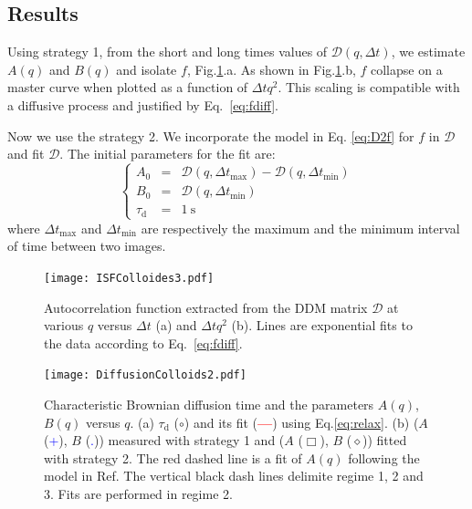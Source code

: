 \documentclass[prb,twocolumn,amsmath,amssymb]{revtex4-1}
\newcommand{\tgn}[1]{{\color{blue}#1}} %
\begin{document}
\subsection{Results}
\label{sec:resultcolloid}
Using strategy 1, from the short and long times values of $\mathcal{D}(q,\Delta t)$, we estimate $A(q)$ and $B(q)$ and isolate $f$, Fig.\ref{fig:ISF}.a. As shown in  Fig.\ref{fig:ISF}.b, $f$ collapse on a master curve when plotted as a function of $\Delta t q^2$. This scaling is compatible with a diffusive process and justified by Eq.~\ref{eq:fdiff}. 

Now we use the strategy 2. We incorporate the model in Eq. \eqref{eq:D2f} for $f$ in $\mathcal{D}$ and fit $\mathcal{D}$. The initial parameters for the fit are:
\begin{equation}
\left\{
\begin{array}{rcl}
A_0 &=& \mathcal{D} (q,\Delta t_\text{max}) - \mathcal{D} (q,\Delta t_\text{min}) \\
B_0 &=& \mathcal{D} (q,\Delta t_\text{min}) \\
\tau_\text{d} &=& \SI{1}{\second}
\end{array}
\right.
\end{equation}
where $\Delta t_\text{max}$ and $\Delta t_\text{min}$ are respectively the maximum and the minimum interval of time between two images.

\begin{figure}
	\texttt{[image: ISFColloides3.pdf]}\\
	\caption{Autocorrelation function extracted from the DDM matrix $\mathcal{D}$ at various $q$ versus $\Delta t$ (a) and $\Delta tq^2$ (b). Lines are exponential fits to the data according to Eq.~\ref{eq:fdiff}.}
	\label{fig:ISF}
\end{figure}

\begin{figure}
	\texttt{[image: DiffusionColloids2.pdf]}\\
	\caption{Characteristic Brownian diffusion time and the parameters $A(q)$, $B(q)$ versus $q$. \tgn{(a) $\tau_\text{d}$ ($\circ$) and its fit (\textcolor{red}{\textbf{---}}) using Eq.\ref{eq:relax}. (b)  ($A$ (\textcolor{blue}{+}), $B$ (\textcolor{blue}{.})) measured with strategy 1  and ($A$ ($\Box$), $B$ ($\diamond$))  fitted with strategy 2. The red dashed line is a fit of $A(q)$ following the model in Ref\citep{3_DDM3D}. The vertical black dash lines delimite regime 1, 2 and 3. Fits are performed in regime 2.} }
	\label{fig:FitDiffColl}
\end{figure}
\end{document}
